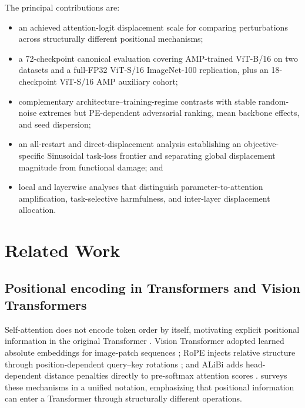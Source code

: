 \documentclass[preprint,12pt,authoryear]{elsarticle}
\begin{document}
The principal contributions are:
\begin{itemize}
    \item an achieved attention-logit displacement scale for comparing
    perturbations across structurally different positional mechanisms;

    \item a 72-checkpoint canonical evaluation covering AMP-trained
    ViT-B/16 on two datasets and a full-FP32 ViT-S/16 ImageNet-100
    replication, plus an 18-checkpoint ViT-S/16 AMP auxiliary cohort;

    \item complementary architecture--training-regime contrasts with stable
    random-noise extremes but PE-dependent adversarial ranking, mean backbone
    effects, and seed dispersion;

    \item an all-restart and direct-displacement analysis establishing an
    objective-specific Sinusoidal task-loss frontier and separating global
    displacement magnitude from functional damage; and

    \item local and layerwise analyses that distinguish
    parameter-to-attention amplification, task-selective harmfulness, and
    inter-layer displacement allocation.
\end{itemize}

\section{Related Work}
\label{sec:related-work}

\subsection{Positional encoding in Transformers and Vision Transformers}

Self-attention does not encode token order by itself, motivating explicit
positional information in the original Transformer
\citep{vaswani2017attention}. Vision Transformer adopted learned absolute
embeddings for image-patch sequences \citep{dosovitskiy2021image}; RoPE
injects relative structure through position-dependent query--key rotations
\citep{su2024roformer}; and ALiBi adds head-dependent distance penalties
directly to pre-softmax attention scores \citep{press2022train}.
\citet{dufter2022position} surveys these mechanisms in a unified notation,
emphasizing that positional information can enter a Transformer through
structurally different operations.
\end{document}
